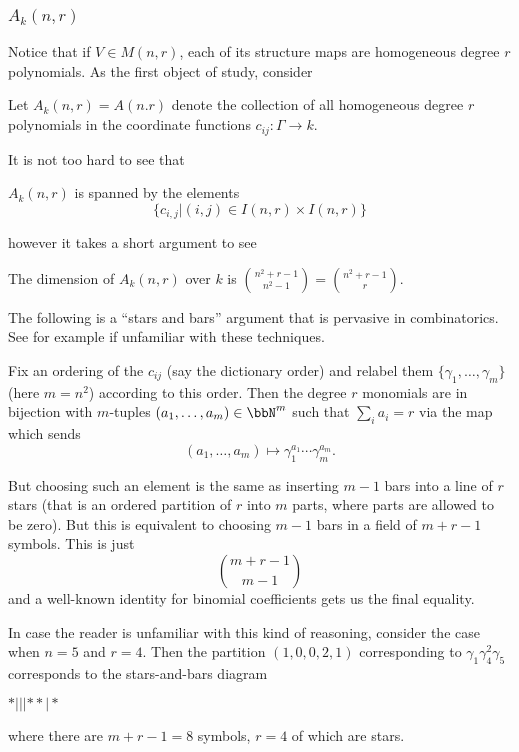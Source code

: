 \documentclass[12pt]{article}
\begin{document}
\subsubsection{\texorpdfstring{$A_k(n,r)$}{Ak(n,r)}}
Notice that if $V\in M(n,r)$, each of its structure maps are homogeneous degree $r$ polynomials. As the first object of study, consider 
\begin{defn}
	Let $A_k(n,r)=A(n.r)$ denote the collection of all homogeneous degree $r$ polynomials in the 
	coordinate functions $c_{ij}:\Gamma\to k$.
\end{defn}
It is not too hard to see that 
\begin{prop}
	$A_k(n,r)$ is spanned by the elements 
	\[\{c_{i,j}|(i,j)\in I(n,r)\times I(n,r)\}\]
\end{prop}
however it takes a short argument to see 
\begin{lem}
	The dimension of $A_k(n,r)$ over $k$ is $\binom{n^2+r-1}{n^2-1}=\binom{n^2+r-1}{r}$.
\end{lem}
\begin{prf}
	The following is a ``stars and bars'' argument that is pervasive in combinatorics. See for example \cite{stanley} if unfamiliar with these techniques.
	
	Fix an ordering of the $c_{ij}$ (say the dictionary order)
	and relabel them $\{\gamma_1,\dots,\gamma_{m}\}$ (here $m=n^2$) according to this order. Then the degree $r$ monomials are in bijection with $m$-tuples $(a_1,\dots,a_{m})\in\bbN^m$ such that $\sum_i a_i=r$ via the map which sends 
	\[(a_1,\dots,a_{m})\mapsto \gamma_1^{a_1}\cdots\gamma_{m}^{a_{m}}.\]

	But choosing such an element is the same as inserting $m-1$ bars into a line of $r$ stars (that is an ordered partition of $r$ into $m$ parts, 
	where parts are allowed to be zero). But this is equivalent to choosing $m-1$ bars in a field of $m+r-1$ symbols. This is just 
	\[\binom{m+r-1}{m-1}\]
	and a well-known identity for binomial coefficients gets us the final equality.
\end{prf}
\begin{ex}
	In case the reader is unfamiliar with this kind of reasoning, consider the case when $n=5$ and $r=4$. Then the partition $(1,0,0,2,1)$ corresponding to 
	$\gamma_1\gamma_4^2\gamma_5$ corresponds to the stars-and-bars diagram 
	\begin{center}
		$\ast|||\ast\ast|\ast$
	\end{center}
	where there are $m+r-1=8$ symbols, $r=4$ of which are stars.
\end{ex}
\end{document}
